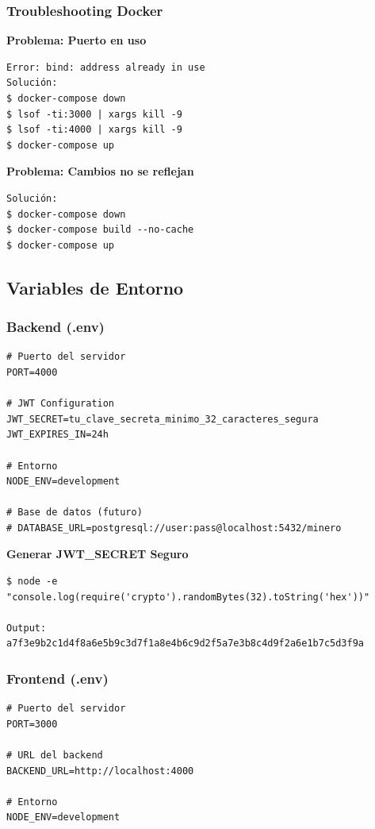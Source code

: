 \documentclass[12pt,a4paper]{article}
\begin{document}
\subsubsection{Troubleshooting Docker}

\textbf{Problema: Puerto en uso}
\begin{verbatim}
Error: bind: address already in use
Solución:
$ docker-compose down
$ lsof -ti:3000 | xargs kill -9
$ lsof -ti:4000 | xargs kill -9
$ docker-compose up
\end{verbatim}

\textbf{Problema: Cambios no se reflejan}
\begin{verbatim}
Solución:
$ docker-compose down
$ docker-compose build --no-cache
$ docker-compose up
\end{verbatim}

\subsection{Variables de Entorno}

\subsubsection{Backend (.env)}

\begin{verbatim}
# Puerto del servidor
PORT=4000

# JWT Configuration
JWT_SECRET=tu_clave_secreta_minimo_32_caracteres_segura
JWT_EXPIRES_IN=24h

# Entorno
NODE_ENV=development

# Base de datos (futuro)
# DATABASE_URL=postgresql://user:pass@localhost:5432/minero
\end{verbatim}

\textbf{Generar JWT\_SECRET Seguro}
\begin{verbatim}
$ node -e "console.log(require('crypto').randomBytes(32).toString('hex'))"

Output:
a7f3e9b2c1d4f8a6e5b9c3d7f1a8e4b6c9d2f5a7e3b8c4d9f2a6e1b7c5d3f9a
\end{verbatim}

\subsubsection{Frontend (.env)}

\begin{verbatim}
# Puerto del servidor
PORT=3000

# URL del backend
BACKEND_URL=http://localhost:4000

# Entorno
NODE_ENV=development
\end{verbatim}
\end{document}
